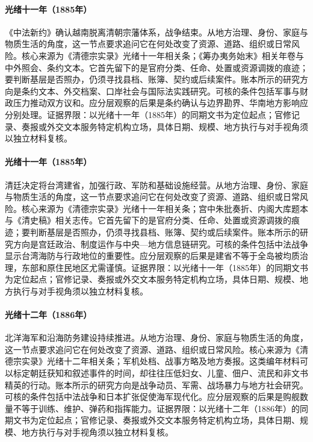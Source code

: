 \hypertarget{social:EQ-1885-TIANJIN-CHINA-FRANCE-TREATY}{}\paragraph{光绪十一年（1885年）}《中法新约》确认越南脱离清朝宗藩体系，战争结束。从地方治理、身份、家庭与物质生活的角度，这一节点要求追问它在何处改变了资源、道路、组织或日常风险。核心来源为《清德宗实录》光绪十一年相关条；《筹办夷务始末》相关年卷与中外照会、条约文本。它首先留下的是官府分类、任命、处置或资源调拨的痕迹；要判断基层是否照办，仍须寻找县档、账簿、契约或后续案件。账本所示的研究方向是条约文本、外交档案、口岸社会与国际法实践研究。可核的条件包括军事与财政压力推动双方议和。应分层观察的后果是条约确认与边界勘界、华南地方影响应分别处理。证据界限：以光绪十一年（1885年）的同期文书为定位起点；官修记录、奏报或外交文本服务特定机构立场，具体日期、规模、地方执行与对手视角须以独立材料复核。
\hypertarget{social:EQ-1885-TAIWAN-PROVINCE}{}\paragraph{光绪十一年（1885年）}清廷决定将台湾建省，加强行政、军防和基础设施经营。从地方治理、身份、家庭与物质生活的角度，这一节点要求追问它在何处改变了资源、道路、组织或日常风险。核心来源为《清德宗实录》光绪十一年相关条；宫中朱批奏折、内阁大库题本与《清史稿》相关志传。它首先留下的是官府分类、任命、处置或资源调拨的痕迹；要判断基层是否照办，仍须寻找县档、账簿、契约或后续案件。账本所示的研究方向是宫廷政治、制度运作与中央—地方信息链研究。可核的条件包括中法战争显示台湾海防与行政地位的重要性。应分层观察的后果是建省不等于全岛被均质治理，东部和原住民地区尤需谨慎。证据界限：以光绪十一年（1885年）的同期文书为定位起点；官修记录、奏报或外交文本服务特定机构立场，具体日期、规模、地方执行与对手视角须以独立材料复核。
\hypertarget{social:EQ-1886-BEIYANG-NAVY-EXPANSION}{}\paragraph{光绪十二年（1886年）}北洋海军和沿海防务建设持续推进。从地方治理、身份、家庭与物质生活的角度，这一节点要求追问它在何处改变了资源、道路、组织或日常风险。核心来源为《清德宗实录》光绪十二年相关条；军机处档、战事方略及地方奏报。这类编年材料可以标定朝廷获知和叙述事件的时间，却往往压低妇女、儿童、佃户、流民和非文书精英的行动。账本所示的研究方向是战争动员、军需、战场暴力与地方社会研究。可核的条件包括中法战争和日本扩张促使海军现代化。应分层观察的后果是购舰数量不等于训练、维护、弹药和指挥能力。证据界限：以光绪十二年（1886年）的同期文书为定位起点；官修记录、奏报或外交文本服务特定机构立场，具体日期、规模、地方执行与对手视角须以独立材料复核。
